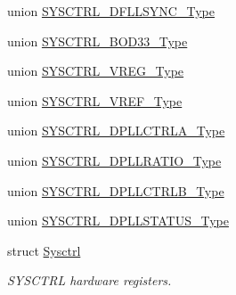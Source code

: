 \begin{DoxyCompactItemize}
\item 
union \mbox{\hyperlink{union_s_y_s_c_t_r_l___d_f_l_l_s_y_n_c___type}{S\+Y\+S\+C\+T\+R\+L\+\_\+\+D\+F\+L\+L\+S\+Y\+N\+C\+\_\+\+Type}}
\item 
union \mbox{\hyperlink{union_s_y_s_c_t_r_l___b_o_d33___type}{S\+Y\+S\+C\+T\+R\+L\+\_\+\+B\+O\+D33\+\_\+\+Type}}
\item 
union \mbox{\hyperlink{union_s_y_s_c_t_r_l___v_r_e_g___type}{S\+Y\+S\+C\+T\+R\+L\+\_\+\+V\+R\+E\+G\+\_\+\+Type}}
\item 
union \mbox{\hyperlink{union_s_y_s_c_t_r_l___v_r_e_f___type}{S\+Y\+S\+C\+T\+R\+L\+\_\+\+V\+R\+E\+F\+\_\+\+Type}}
\item 
union \mbox{\hyperlink{union_s_y_s_c_t_r_l___d_p_l_l_c_t_r_l_a___type}{S\+Y\+S\+C\+T\+R\+L\+\_\+\+D\+P\+L\+L\+C\+T\+R\+L\+A\+\_\+\+Type}}
\item 
union \mbox{\hyperlink{union_s_y_s_c_t_r_l___d_p_l_l_r_a_t_i_o___type}{S\+Y\+S\+C\+T\+R\+L\+\_\+\+D\+P\+L\+L\+R\+A\+T\+I\+O\+\_\+\+Type}}
\item 
union \mbox{\hyperlink{union_s_y_s_c_t_r_l___d_p_l_l_c_t_r_l_b___type}{S\+Y\+S\+C\+T\+R\+L\+\_\+\+D\+P\+L\+L\+C\+T\+R\+L\+B\+\_\+\+Type}}
\item 
union \mbox{\hyperlink{union_s_y_s_c_t_r_l___d_p_l_l_s_t_a_t_u_s___type}{S\+Y\+S\+C\+T\+R\+L\+\_\+\+D\+P\+L\+L\+S\+T\+A\+T\+U\+S\+\_\+\+Type}}
\item 
struct \mbox{\hyperlink{struct_sysctrl}{Sysctrl}}
\begin{DoxyCompactList}\small\item\em S\+Y\+S\+C\+T\+RL hardware registers. \end{DoxyCompactList}\end{DoxyCompactItemize}
